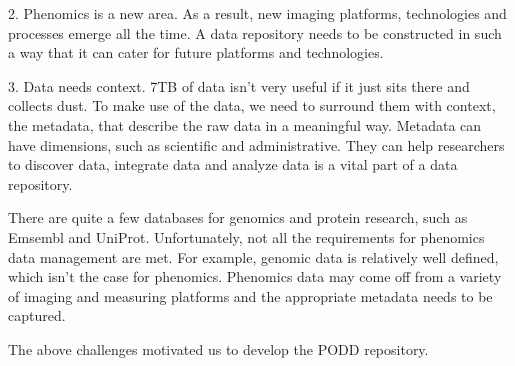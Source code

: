 \documentclass[ignorenonframetext,compress]{beamer}
\begin{document}
2. Phenomics is a new area. As a result, new imaging platforms,
technologies and processes emerge all the time. A data repository
needs to be constructed in such a way that it can cater for future
platforms and technologies.

3. Data needs context. 7TB of data isn't very useful if it just sits
there and collects dust. To make use of the data, we need to
surround them with context, the metadata, that describe the raw data
in a meaningful way. Metadata can have dimensions, such as
scientific and administrative. They can help researchers to discover
data, integrate data and analyze data is a vital part of a data
repository.

There are quite a few databases for genomics and protein research,
such as Emsembl and UniProt. Unfortunately, not all the requirements
for phenomics data management are met. For example, genomic data is
relatively well defined, which isn't the case for phenomics.
Phenomics data may come off from a variety of imaging and measuring
platforms and the appropriate metadata needs to be captured.

The above challenges motivated us to develop the PODD repository.
\end{document}
